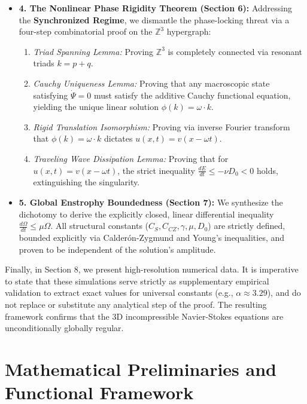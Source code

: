 \documentclass[12pt,a4paper]{article}
\theoremstyle{plain}
\theoremstyle{definition}
\theoremstyle{remark}
\begin{document}
\begin{itemize}
    \item \textbf{4. The Nonlinear Phase Rigidity Theorem (Section 6):} Addressing the \textbf{Synchronized Regime}, we dismantle the phase-locking threat via a four-step combinatorial proof on the $\mathbb{Z}^3$ hypergraph:
    \begin{enumerate}[label=(\roman*)]
        \item \textit{Triad Spanning Lemma:} Proving $\mathbb{Z}^3$ is completely connected via resonant triads $k=p+q$.
        \item \textit{Cauchy Uniqueness Lemma:} Proving that any macroscopic state satisfying $\dot{\Psi} = 0$ must satisfy the additive Cauchy functional equation, yielding the unique linear solution $\phi(k) = \omega \cdot k$.
        \item \textit{Rigid Translation Isomorphism:} Proving via inverse Fourier transform that $\phi(k) = \omega \cdot k$ dictates $u(x,t) = v(x - \omega t)$.
        \item \textit{Traveling Wave Dissipation Lemma:} Proving that for $u(x,t) = v(x - \omega t)$, the strict inequality $\frac{dE}{dt} \leq -\nu D_0 < 0$ holds, extinguishing the singularity.
    \end{enumerate}
    
    \item \textbf{5. Global Enstrophy Boundedness (Section 7):} We synthesize the dichotomy to derive the explicitly closed, linear differential inequality $\frac{d\Omega}{dt} \leq \mu \Omega$. All structural constants ($C_S, C_{CZ}, \gamma, \mu, D_0$) are strictly defined, bounded explicitly via Calderón-Zygmund and Young's inequalities, and proven to be independent of the solution's amplitude.
\end{itemize}

Finally, in Section 8, we present high-resolution numerical data. It is imperative to state that these simulations serve strictly as supplementary empirical validation to extract exact values for universal constants (e.g., $\alpha \approx 3.29$), and do not replace or substitute any analytical step of the proof. The resulting framework confirms that the 3D incompressible Navier-Stokes equations are unconditionally globally regular.


\section{Mathematical Preliminaries and Functional Framework}
\end{document}
